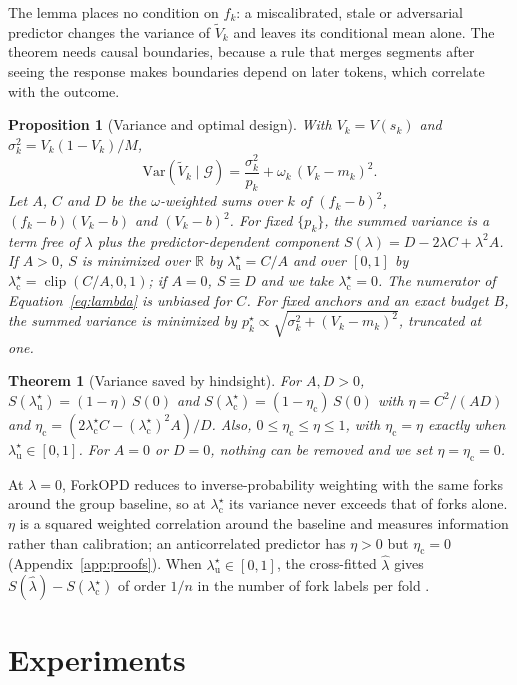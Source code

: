\documentclass[11pt]{article}
\newcommand{\method}{ForkOPD}
\newcommand{\Vt}{\tilde V}
\newcommand{\Var}{\mathrm{Var}}
\newcommand{\G}{\mathcal{G}}
\newcommand{\clip}{\operatorname{clip}}
\newcommand{\lamu}{\lambda^\star_{\mathrm u}}
\newcommand{\lamc}{\lambda^\star_{\mathrm c}}
\newcommand{\etac}{\eta_{\mathrm c}}
\newtheorem{theorem}{Theorem}
\newtheorem{proposition}{Proposition}
\theoremstyle{remark}
\begin{document}
The lemma places no condition on $f_k$: a miscalibrated, stale or adversarial predictor changes the variance of $\Vt_k$ and leaves its conditional mean alone. The theorem needs causal boundaries, because a rule that merges segments after seeing the response makes boundaries depend on later tokens, which correlate with the outcome.

\begin{proposition}[Variance and optimal design]\label{prop:variance}
With $V_k=V(s_k)$ and $\sigma_k^2=V_k(1-V_k)/M$,
\begin{equation}
\Var(\Vt_k\mid\G)=\frac{\sigma_k^2}{p_k}+\omega_k\,(V_k-m_k)^2 .
\label{eq:variance}
\end{equation}
Let $A$, $C$ and $D$ be the $\omega$-weighted sums over $k$ of $(f_k-b)^2$, $(f_k-b)(V_k-b)$ and $(V_k-b)^2$. For fixed $\{p_k\}$, the summed variance is a term free of $\lambda$ plus the predictor-dependent component $S(\lambda)=D-2\lambda C+\lambda^2A$. If $A>0$, $S$ is minimized over $\mathbb{R}$ by $\lamu=C/A$ and over $[0,1]$ by $\lamc=\clip(C/A,0,1)$; if $A=0$, $S\equiv D$ and we take $\lamc=0$. The numerator of Equation~\eqref{eq:lambda} is unbiased for $C$. For fixed anchors and an exact budget $B$, the summed variance is minimized by $p_k^\star\propto\sqrt{\sigma_k^2+(V_k-m_k)^2}$, truncated at one.
\end{proposition}

\begin{theorem}[Variance saved by hindsight]\label{thm:eta}
For $A,D>0$, $S(\lamu)=(1-\eta)\,S(0)$ and $S(\lamc)=(1-\etac)\,S(0)$ with $\eta=C^2/(AD)$ and $\etac=(2\lamc C-(\lamc)^2A)/D$. Also, $0\le\etac\le\eta\le1$, with $\etac=\eta$ exactly when $\lamu\in[0,1]$. For $A=0$ or $D=0$, nothing can be removed and we set $\eta=\etac=0$.
\end{theorem}

At $\lambda=0$, \method{} reduces to inverse-probability weighting with the same forks around the group baseline, so at $\lamc$ its variance never exceeds that of forks alone. $\eta$ is a squared weighted correlation around the baseline and measures information rather than calibration; an anticorrelated predictor has $\eta>0$ but $\etac=0$ (Appendix~\ref{app:proofs}). When $\lamu\in[0,1]$, the cross-fitted $\hat\lambda$ gives $S(\hat\lambda)-S(\lamc)$ of order $1/n$ in the number of fork labels per fold \citep{angelopoulos2023ppipp}.

\section{Experiments}
\label{sec:experiments}
\end{document}
